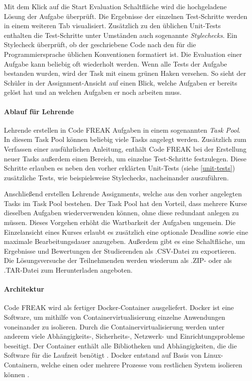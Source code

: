 Mit dem Klick auf die \glqq Start Evaluation\grqq{} Schaltfläche wird die
hochgeladene Lösung der Aufgabe überprüft. Die Ergebnisse der einzelnen
Test-Schritte werden in einem weiteren Tab visualisiert. Zusätzlich zu den
üblichen Unit-Tests enthalten die Test-Schritte unter Umständen auch
sogenannte \emph{Stylechecks}. Ein Stylecheck überprüft, ob der geschriebene
Code nach den für die Programmiersprache üblichen Konventionen formatiert ist.
Die Evaluation einer Aufgabe kann beliebig oft wiederholt werden. Wenn alle
Tests der Aufgabe bestanden wurden, wird der Task mit einem grünen Haken
versehen. So sieht der Schüler in der Assignment-Ansicht auf einen Blick, welche
Aufgaben er bereits gelöst hat und an welchen Aufgaben er noch arbeiten muss.

\paragraph{Ablauf für Lehrende}
Lehrende erstellen in Code FREAK Aufgaben in einem sogenannten \emph{Task Pool}.
In diesem Task Pool können beliebig viele Tasks angelegt werden. Zusätzlich zum
Verfassen einer ausführlichen Anleitung, enthält Code FREAK bei der Erstellung
neuer Tasks außerdem einen Bereich, um einzelne Test-Schritte festzulegen. Diese
Schritte erlauben es neben den vorher erklärten Unit-Tests (siehe
\autoref{unit-tests}) zusätzliche Tests, wie beispielsweise Stylechecks,
nacheinander auszuführen.

Anschließend erstellen Lehrende Assignments, welche aus den vorher angelegten
Tasks im Task Pool bestehen. Der Task Pool hat den Vorteil, dass mehrere Kurse
dieselben Aufgaben wiederverwenden können, ohne diese redundant anlegen zu
müssen. Dieses Vorgehen erhöht die Wartbarkeit der Aufgaben ungemein. Die
Einzelansicht eines Kurses erlaubt es zusätzlich eine optionale Deadline sowie
eine maximale Bearbeitungsdauer anzugeben. Außerdem gibt es eine Schaltfläche,
um Ergebnisse und Bewertungen der Studierenden als .CSV-Datei zu exportieren.
Die Lösungsversuche der Teilnehmenden werden wiederum als .ZIP- oder als
.TAR-Datei zum Herunterladen angeboten.

\paragraph{Architektur}
Code FREAK wird als fertiger Docker-Container ausgeliefert. Docker ist eine
Software, um mithilfe von Containervirtualisierung einzelne Anwendungen
voneinander zu isolieren. Durch die Containervirtualisierung werden unter
anderem viele Abhängigkeits-, Sicherheits-, Netzwerk- und Einrichtungsprobleme
beseitigt. Der Container enthält alle Bibliotheken und Abhängigkeiten, die die
Software für die Laufzeit benötigt \parencite{docker}. Docker entstand auf Basis
von Linux-Containern, welche einen oder mehrere Prozesse vom restlichen System
isolieren können 
\parencite{linux-container}.

